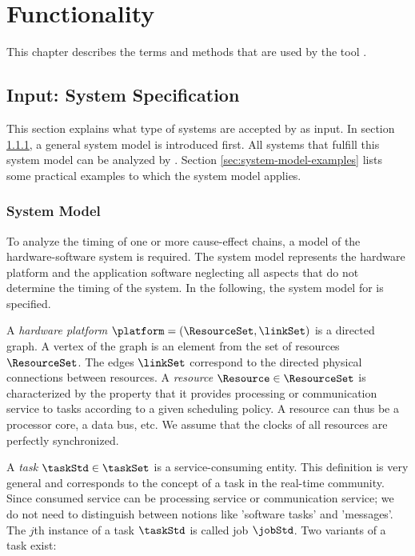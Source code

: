 \section{Functionality}
%
This chapter describes the terms and methods that are used by the tool \Tool.


\subsection{Input: System Specification}
This section explains what type of systems are accepted by \Tool as input.
In section \ref{sec:system-model}, a general system model is introduced first. 
All systems that fulfill this system model can be analyzed by \Tool.
Section \ref{sec:system-model-examples} lists some practical examples to which the system model applies. 


\subsubsection{System Model}
\label{sec:system-model}
To analyze the timing of one or more cause-effect chains, a model of the hardware-software system is required. 
The system model represents the hardware platform and the application software neglecting all aspects that do not determine the timing of the system. 
In the following, the system model for \Tool is specified.
\bigskip

A \emph{hardware platform} $\platform = (\ResourceSet, \linkSet)$ is a directed graph.
A vertex of the graph is an element from the set of resources $\ResourceSet$.
The edges $\linkSet$ correspond to the directed physical connections between resources.
%
A \emph{resource} $\Resource \in \ResourceSet$ is characterized by the property that it provides processing or communication service to tasks according to a given scheduling policy. 
A resource can thus be a processor core, a data bus, etc.  
We assume that the clocks of all resources are perfectly synchronized. 

A \emph{task} $\taskStd \in \taskSet$ is a service-consuming entity. 
This definition is very general and corresponds to the concept of a task in the real-time community.
Since consumed service can be processing service or communication service; we do not need to distinguish between notions like 'software tasks' and 'messages'. 
The $j$th instance of a task $\taskStd$ is called job $\jobStd$.
Two variants of a task exist: 
\bigskip

